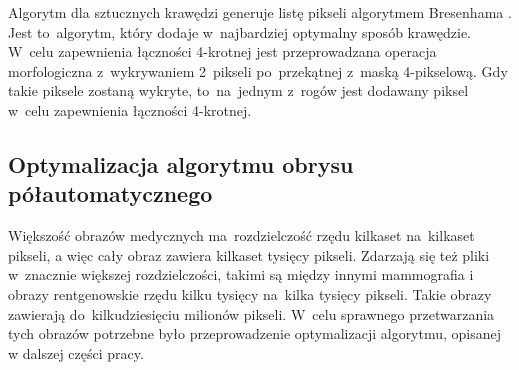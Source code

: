 \documentclass[a4paper,11pt,twoside,openright]{report}
\theoremstyle{definition}
\begin{document}
Algorytm dla sztucznych krawędzi generuje listę pikseli algorytmem Bresenhama
\cite{Bresenham}. Jest to~algorytm, który dodaje w~najbardziej optymalny sposób
krawędzie. W~celu zapewnienia łączności 4-krotnej jest przeprowadzana operacja
morfologiczna z~wykrywaniem 2~pikseli po~przekątnej z~maską 4-pikselową. Gdy takie
piksele zostaną wykryte, to~na~jednym z~rogów jest dodawany piksel w~celu
zapewnienia łączności 4-krotnej.

\subsection {Optymalizacja algorytmu obrysu półautomatycznego}

Większość obrazów medycznych ma~rozdzielczość rzędu kilkaset na~kilkaset pikseli,
a więc cały obraz zawiera kilkaset tysięcy pikseli. Zdarzają się też
pliki w~znacznie większej rozdzielczości, takimi są między innymi mammografia i
obrazy rentgenowskie rzędu kilku tysięcy na~kilka tysięcy pikseli.
Takie obrazy zawierają do~kilkudziesięciu milionów
pikseli. W~celu sprawnego przetwarzania tych obrazów potrzebne było przeprowadzenie optymalizacji
algorytmu, opisanej w dalszej części pracy.
\end{document}
